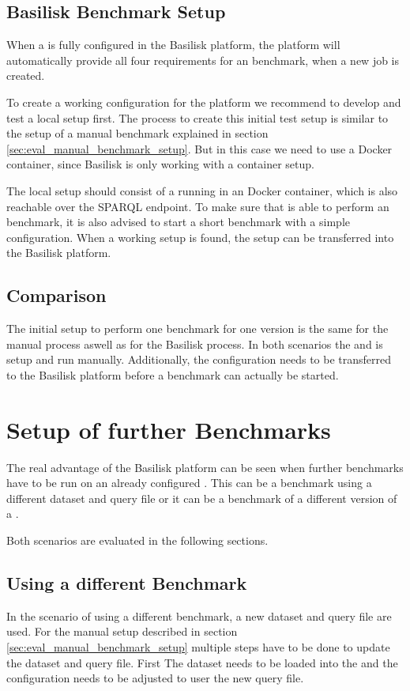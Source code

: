 \subsection{Basilisk Benchmark Setup}
When a \ts{} is fully configured in the Basilisk platform, the platform will automatically provide all four requirements for an benchmark, when a new job is created.

To create a working configuration for the platform we recommend to develop and test a local setup first.
The process to create this initial test setup is similar to the setup of a manual benchmark explained in section \ref{sec:eval_manual_benchmark_setup}.
But in this case we need to use a Docker container, since Basilisk is only working with a container setup.

The local setup should consist of a \ts{} running in an Docker container, which is also reachable over the SPARQL endpoint.
To make sure that \iguana{} is able to perform an benchmark, it is also advised to start a short benchmark with a simple \iguana{} configuration.
When a working setup is found, the setup can be transferred into the Basilisk platform.


\subsection{Comparison}
The initial setup to perform one benchmark for one \ts{} version is the same for the manual process aswell as for the Basilisk process.
In both scenarios the \ts{} and \iguana{} is setup and run manually.
Additionally, the configuration needs to be transferred to the Basilisk platform before a benchmark can actually be started.


\section{Setup of further Benchmarks}
The real advantage of the Basilisk platform can be seen when further benchmarks have to be run on an already configured \ts{}.
This can be a benchmark using a different dataset and query file or it can be a benchmark of a different version of a \ts{}.

Both scenarios are evaluated in the following sections.

\subsection{Using a different Benchmark}
In the scenario of using a different benchmark, a new dataset and query file are used.
For the manual setup described in section \ref{sec:eval_manual_benchmark_setup} multiple steps have to be done to update the dataset and query file.
First The dataset needs to be loaded into the \ts{} and the \iguana{} configuration needs to be adjusted to user the new query file.
\\

